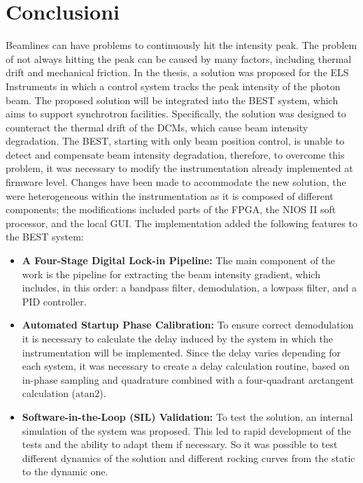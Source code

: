 \chapter*{Conclusioni}
\label{chap:concl}

Beamlines can have problems to continuously hit the intensity peak.
The problem of not always hitting the peak can be caused by many factors, including thermal drift and mechanical friction.
In the thesis, a solution was proposed for the ELS Instruments in which a control system tracks the peak intensity of the photon beam. 
The proposed solution will be integrated into the BEST system, which aims to support synchrotron facilities.
Specifically, the solution was designed to counteract the thermal drift of the DCMs, which cause beam intensity degradation.
The BEST, starting with only beam position control, is unable to detect and compensate beam intensity degradation, therefore, to overcome this problem, it was necessary to modify the instrumentation already implemented at firmware level. 
Changes have been made to accommodate the new solution, the were heterogeneous within the instrumentation as it is composed of different components; the modifications included parts of the FPGA, the NIOS II soft processor, and the local GUI.
The implementation added the following features to the BEST system:

\begin{itemize}
    \item \textbf{A Four-Stage Digital Lock-in Pipeline:} 
    The main component of the work is the pipeline for extracting the beam intensity gradient, which includes, in this order: a bandpass filter, demodulation, a lowpass filter, and a PID controller.
    \item \textbf{Automated Startup Phase Calibration:} 
    To ensure correct demodulation it is necessary to calculate the delay induced by the system in which the instrumentation will be implemented.
    Since the delay varies depending for each system, it was necessary to create a delay calculation routine, based on in-phase sampling and quadrature combined with a four-quadrant arctangent calculation ($\text{atan2}$).
    \item \textbf{Software-in-the-Loop (SIL) Validation:} 
    To test the solution, an internal simulation of the system was proposed. This led to rapid development of the tests and the ability to adapt them if necessary. So it was possible to test different dynamics of the solution and different rocking curves from the static to the dynamic one.
\end{itemize}

